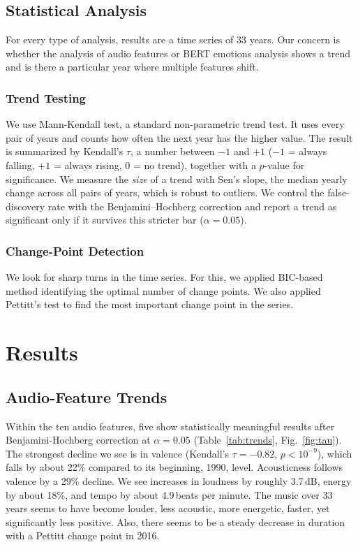 \documentclass[conference]{IEEEtran}
\begin{document}
\subsection{Statistical Analysis}
For every type of analysis, results are a time series of 33 years. Our concern
is whether the analysis of audio features or BERT emotions analysis shows
a trend and is there a particular year where multiple features shift.

\subsubsection{Trend Testing}
We use Mann-Kendall test, a standard non-parametric trend test. It uses
every pair of years and counts how often the next year has the higher value.
The result is summarized by Kendall's $\tau$, a number between $-1$ and $+1$ 
($-1$ = always falling, $+1$ = always rising, $0$ = no trend), 
together with a $p$-value for significance. We measure the \emph{size} of a 
trend with Sen's slope, the median yearly change across all pairs of years, 
which is robust to outliers. We control the false-discovery rate with the 
Benjamini--Hochberg correction and report a trend as significant only 
if it survives this stricter bar ($\alpha = 0.05$).

\subsubsection{Change-Point Detection}
We look for sharp turns in the time series. For this, we applied BIC-based
method identifying the optimal number of change points. We also applied Pettitt's
test to find the most important change point in the series.

\section{Results}

\subsection{Audio-Feature Trends}
Within the ten audio features, five show statistically 
meaningful results after Benjamini-Hochberg correction at 
$\alpha = 0.05$ (Table~\ref{tab:trends}, Fig.~\ref{fig:tau}).
The strongest decline we see is in valence (Kendall's $\tau = -0.82$, $p < 10^{-9}$), 
which falls by about 22\% compared to its beginning, 1990, level.
Acousticness follows valence by a 29\% decline. We see increases in loudness
by roughly 3.7\,dB, energy by about 18\%, and tempo by about 4.9\,beats per minute.
The music over 33 years seems to have become louder, less acoustic, more energetic,
faster, yet significantly less positive. Also, there seems to be a steady
decrease in duration with a Pettitt change point in 2016.
\end{document}
